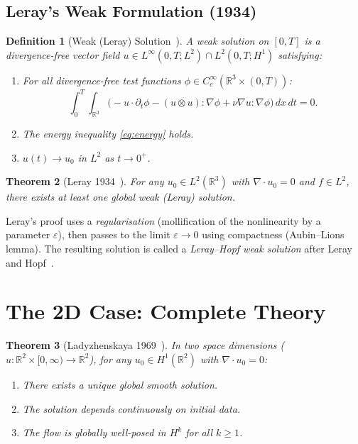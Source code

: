 \documentclass[12pt,a4paper]{article}
\newtheorem{theorem}{Theorem}[section]
\newtheorem{definition}[theorem]{Definition}
\theoremstyle{remark}
\begin{document}
\subsection{Leray's Weak Formulation (1934)}

\begin{definition}[Weak (Leray) Solution~\cite{Leray1934}]
  A \emph{weak solution} on $[0,T]$ is a divergence-free vector field
  $u \in L^\infty(0,T; L^2) \cap L^2(0,T; H^1)$ satisfying:
  \begin{enumerate}[nosep]
    \item For all divergence-free test functions $\phi \in C_c^\infty(\mathbb{R}^3 \times (0,T))$:
    \[
      \int_0^T\!\int_{\mathbb{R}^3} \!\bigl(-u \cdot \partial_t \phi
      - (u\otimes u):\nabla\phi + \nu \nabla u : \nabla\phi\bigr)\,dx\,dt = 0.
    \]
    \item The energy inequality \eqref{eq:energy} holds.
    \item $u(t) \to u_0$ in $L^2$ as $t \to 0^+$.
  \end{enumerate}
\end{definition}

\begin{theorem}[Leray 1934~\cite{Leray1934}]
  For any $u_0 \in L^2(\mathbb{R}^3)$ with $\nabla \cdot u_0 = 0$ and $f \in L^2$,
  there exists at least one global weak (Leray) solution.
\end{theorem}

Leray's proof uses a \emph{regularisation} (mollification of the nonlinearity by a
parameter $\varepsilon$), then passes to the limit $\varepsilon \to 0$ using compactness
(Aubin--Lions lemma).  The resulting solution is called a \emph{Leray--Hopf weak solution}
after Leray~\cite{Leray1934} and Hopf~\cite{Hopf1951}.

\section{The 2D Case: Complete Theory}

\begin{theorem}[Ladyzhenskaya 1969~\cite{Lady1969}]
  In two space dimensions ($u\colon \mathbb{R}^2 \times [0,\infty) \to \mathbb{R}^2$),
  for any $u_0 \in H^1(\mathbb{R}^2)$ with $\nabla \cdot u_0 = 0$:
  \begin{enumerate}[nosep]
    \item There exists a unique global smooth solution.
    \item The solution depends continuously on initial data.
    \item The flow is globally well-posed in $H^k$ for all $k \geq 1$.
  \end{enumerate}
\end{theorem}
\end{document}

